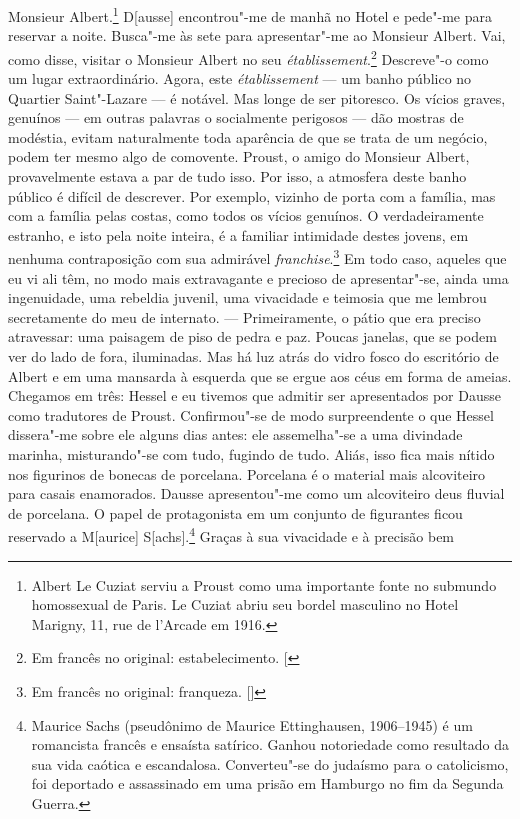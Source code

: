 Monsieur Albert.\footnote{Albert Le Cuziat
  serviu a Proust como uma importante fonte no submundo homossexual de
  Paris. Le Cuziat abriu seu bordel
  masculino no Hotel Marigny, 11, rue de l'Arcade em 1916. \versal{[N.~O.]}}
D{[}ausse{]} encontrou"-me de manhã no Hotel e pede"-me para reservar a
noite. Busca"-me às sete para apresentar"-me ao Monsieur Albert. Vai, como
disse, visitar o Monsieur Albert no seu \emph{établissement}.\footnote{Em francês no original: estabelecimento. {[}\versal{N.~T.}{]}} Descreve"-o
como um lugar extraordinário. Agora, este \emph{établissement} --- um
banho público no Quartier Saint"-Lazare --- é notável. Mas longe de ser
pitoresco. Os vícios graves, genuínos --- em outras palavras o
socialmente perigosos --- dão mostras de modéstia, evitam naturalmente
toda aparência de que se trata de um negócio, podem ter mesmo algo de
comovente. Proust, o amigo do Monsieur Albert, provavelmente estava a
par de tudo isso. Por isso, a atmosfera deste banho público é difícil de
descrever. Por exemplo, vizinho de porta com a família, mas com a
família pelas costas, como todos os vícios genuínos. O verdadeiramente
estranho, e isto pela noite inteira, é a familiar intimidade destes
jovens, em nenhuma contraposição com sua admirável \emph{franchise}.\footnote{Em francês no original: franqueza. []} Em
todo caso, aqueles que eu vi ali têm, no modo mais extravagante e
precioso de apresentar"-se, ainda uma ingenuidade, uma rebeldia juvenil,
uma vivacidade e teimosia que me lembrou secretamente do meu de
internato. --- Primeiramente, o pátio que era preciso atravessar: uma
paisagem de piso de pedra e paz. Poucas janelas, que se podem ver do lado de
fora, iluminadas. Mas há luz atrás do vidro fosco do escritório de Albert e
em uma mansarda à esquerda que se ergue aos céus em forma de ameias. Chegamos
em três: Hessel e eu tivemos que admitir ser apresentados por Dausse como
tradutores de Proust. Confirmou"-se de modo surpreendente o que Hessel
dissera"-me sobre ele alguns dias antes: ele assemelha"-se a uma divindade
marinha, misturando"-se com tudo, fugindo de tudo. Aliás, isso fica mais
nítido nos figurinos de bonecas de porcelana. Porcelana é o material
mais alcoviteiro para casais enamorados. Dausse apresentou"-me como um %
alcoviteiro deus fluvial de porcelana. O papel de protagonista em um
conjunto de figurantes ficou reservado a M{[}aurice{]}
S{[}achs{]}.\footnote{Maurice Sachs (pseudônimo de Maurice
  Ettinghausen, 1906--1945) é um romancista francês e ensaísta satírico.
  Ganhou notoriedade como resultado da sua vida caótica e escandalosa.
  Converteu"-se do judaísmo para o catolicismo,
  foi deportado e assassinado em uma prisão em Hamburgo no
  fim da Segunda Guerra. \versal{[N.~O.]}} Graças à sua vivacidade e à precisão bem
